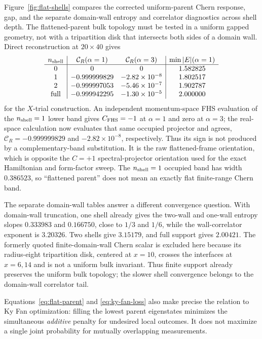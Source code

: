 \documentclass[aps,prb,twocolumn,floatfix,nofootinbib,superscriptaddress]{revtex4-2}
\begin{document}
Figure~\ref{fig:flat-shells} compares the corrected uniform-parent Chern response, gap,
and the separate domain-wall entropy and correlator diagnostics across shell depth.
The flattened-parent bulk topology must be tested in a uniform gapped geometry, not with
a tripartition disk that intersects both sides of a domain wall.  Direct reconstruction at
$20\times40$ gives
\begin{equation}
\begin{array}{c|cc|c}
n_{\rm shell} & \mathcal C_R(\alpha=1) & \mathcal C_R(\alpha=3)
& \min|E|(\alpha=1)\\ \hline
0 & 0 & 0 & 1.582825\\
1 & -0.999999829 & -2.82\times10^{-8} & 1.802517\\
2 & -0.999997053 & -5.46\times10^{-7} & 1.902787\\
\mathrm{full} & -0.999942295 & -1.30\times10^{-5} & 2.000000
\end{array}
\label{eq:uniform-flat-parent-topology}
\end{equation}
for the $X$-trial construction.  An independent momentum-space FHS evaluation of the
$n_{\rm shell}=1$ lower band gives $C_{\rm FHS}=-1$ at $\alpha=1$ and zero at
$\alpha=3$; the real-space calculation now evaluates that same occupied projector and
agrees, $\mathcal C_R=-0.999999829$ and $-2.82\times10^{-8}$, respectively.  Thus its
sign is not produced by a complementary-band substitution.  It is the raw flattened-frame
orientation, which is opposite the $C=+1$ spectral-projector orientation used for the
exact Hamiltonian and form-factor sweep.  The $n_{\rm shell}=1$ occupied band has width
$0.386523$, so
``flattened parent'' does not mean an exactly flat finite-range Chern band.

The separate domain-wall tables answer a different convergence question.  With
domain-wall truncation, one shell already gives the two-wall and one-wall entropy slopes
$0.333983$ and $0.166750$, close to $1/3$ and $1/6$, while the wall-correlator exponent is
$3.20326$.  Two shells give $3.15179$, and full support gives $2.00421$.  The formerly
quoted finite-domain-wall Chern scalar is excluded here because its radius-eight
tripartition disk, centered at $x=10$, crosses the interfaces at $x=6,14$ and is not a
uniform bulk invariant.  Thus finite support already preserves the uniform bulk topology;
the slower shell convergence belongs to the domain-wall correlator tail.

Equations~\eqref{eq:flat-parent} and \eqref{eq:ky-fan-loss} also make precise the relation
to Ky Fan optimization: filling the lowest parent eigenstates minimizes the simultaneous
\emph{additive} penalty for undesired local outcomes.  It does not maximize a single joint
probability for mutually overlapping measurements.
\end{document}
